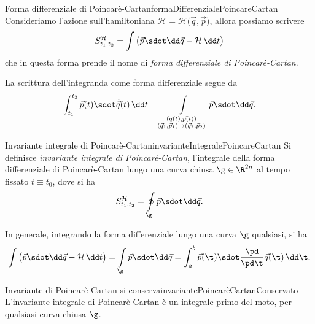 \begin{defn}{Forma differenziale di Poincarè-Cartan}{formaDifferenzialePoincareCartan}
	Consideriamo l'azione sull'hamiltoniana \(\mathcal{H}=\mathcal{H}\big(\vec{q},\vec{p}\big)\), allora possiamo scrivere
	\[
		S_{t_1,t_2}^{\mathcal{H}} = \int \big(\vec{p} \sdot \dd \vec{q} - \mathcal{H}\,\dd t\big)
	\]
	che in questa forma prende il nome di \emph{forma differenziale di Poincarè-Cartan}.
\end{defn}

\begin{oss}
	La scrittura dell'integranda come forma differenziale segue da
	\[
		\int_{t_1}^{t_2} \vec{p}(t) \sdot \dot{\vec{q}}(t)\,\dd t = \int\limits_{\substack{(\vec{q}(t),\vec{p}(t))\\(\vec{q}_1,\vec{p}_1) \to (\vec{q}_2,\vec{p}_2)}} \vec{p} \sdot \dd\vec{q}.
	\]
\end{oss}

\begin{defn}{Invariante integrale di Poincarè-Cartan}{invarianteIntegralePoincareCartan}
	Si definisce \emph{invariante integrale di Poincarè-Cartan}, l'integrale della forma differenziale di Poincarè-Cartan lungo una curva chiusa \(\g\in\R^{2n}\) al tempo fissato \(t\equiv t_0\), dove si ha
	\[
		S_{t_1,t_2}^{\mathcal{H}} = \oint\limits_\g \vec{p} \sdot \dd\vec{q}.
	\]
\end{defn}

\begin{oss}
	In generale, integrando la forma differenziale lungo una curva \(\g\) qualsiasi, si ha
	\[
		\int\big(\vec{p}\sdot\dd\vec{q}-\mathcal{H}\,\dd t\big) = \int\limits_\g \vec{p}\sdot\dd\vec{q} = \int_a^b \vec{p}(\t)\sdot\frac{\pd}{\pd\t}\vec{q}(\t)\,\dd \t.
	\]
\end{oss}

\begin{prop}{Invariante di Poincarè-Cartan si conserva}{invariantePoincarèCartanConservato}
	L'invariante integrale di Poincarè-Cartan è un integrale primo del moto, per qualsiasi curva chiusa \(\g\).
\end{prop}

